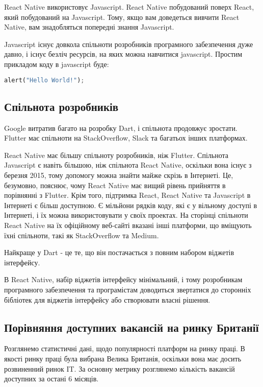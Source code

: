 React Native використовує Javascript.
React Native побудований поверх React, який побудований на Javascript.
Тому, якщо вам доведеться вивчити React Native, вам знадобляться попередні знання Javascript.

Javascript існує довкола спільноти розробників програмного забезпечення дуже давно, і існує безліч ресурсів, на яких можна навчитися javascript.
Простим прикладом коду в javascript буде:

\begin{lstlisting}[style=light, language=Python,label={lst:vectorimg},caption=Dart Hello World]
  alert("Hello World!");
\end{lstlisting}

\subsection{Спільнота розробників}
\label{subsec:communities}

Google витратив багато на розробку Dart, і спільнота продовжує зростати.
Flutter має спільноти на StackOverflow, Slack та багатьох інших платформах.

React Native має більшу спільноту розробників, ніж Flutter.
Спільнота Javascript є навіть більшою, ніж спільнота React Native, оскільки вона існує з березня 2015, тому допомогу можна знайти майже скрізь в Інтернеті.
Це, безумовно, пояснює, чому React Native має вищий рівень прийняття в порівнянні з Flutter.
Крім того, підтримка React, React Native та Javascript в Інтернеті є більш доступною.
Є мільйони рядків коду, які є у вільному доступі в Інтернеті, і їх можна використовувати у своїх проектах.
На сторінці спільноти React Native на їх офіційному веб-сайті вказані інші платформи, що вміщують їхні спільноти, такі як StackOverflow та Medium.

Найкраще у Dart - це те, що він постачається з повним набором віджетів інтерфейсу.

В React Native, набір віджетів інтерфейсу мінімальний, і тому розробникам програмного забезпечення та програмістам доводиться звертатися до сторонніх бібліотек для віджетів інтерфейсу або створювати власні рішення.

\subsection{Порівняння доступних вакансій на ринку Британії}
\label{subsec:market_comparisson}
Розглянемо статистичні дані, щодо популярності платформ на ринку праці.
В якості ринку праці була вибрана Велика Британія, оскільки вона має досить розвиненний ринок IT.
За основну метрику розглянемо кількість вакансій доступних за остані 6 місяців.

